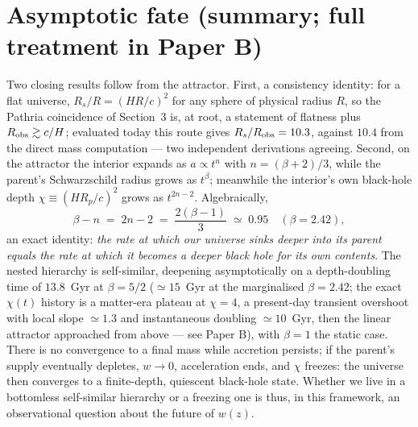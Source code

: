 \documentclass[11pt]{article}
\begin{document}
\section{Asymptotic fate (summary; full treatment in Paper B)}
Two closing results follow from the attractor. First, a consistency identity: for a flat universe, $R_s/R = (HR/c)^2$ for any sphere of physical radius $R$, so the Pathria coincidence of Section~3 is, at root, a statement of flatness plus $R_{\rm obs} \gtrsim c/H$; evaluated today this route gives $R_s/R_{\rm obs} = 10.3$, against $10.4$ from the direct mass computation --- two independent derivations agreeing. Second, on the attractor the interior expands as $a \propto t^{n}$ with $n = (\beta+2)/3$, while the parent's Schwarzschild radius grows as $t^{\beta}$; meanwhile the interior's own black-hole depth $\chi \equiv (HR_p/c)^2$ grows as $t^{2n-2}$. Algebraically,
\begin{equation}
\beta - n \;=\; 2n - 2 \;=\; \frac{2(\beta-1)}{3} \;\simeq\; 0.95 \quad (\beta = 2.42),
\end{equation}
an exact identity: \emph{the rate at which our universe sinks deeper into its parent equals the rate at which it becomes a deeper black hole for its own contents}. The nested hierarchy is self-similar, deepening asymptotically on a depth-doubling time of $13.8$~Gyr at $\beta = 5/2$ ($\simeq 15$~Gyr at the marginalised $\beta = 2.42$; the exact $\chi(t)$ history is a matter-era plateau at $\chi = 4$, a present-day transient overshoot with local slope $\simeq 1.3$ and instantaneous doubling $\simeq 10$~Gyr, then the linear attractor approached from above --- see Paper B), with $\beta = 1$ the static case. There is no convergence to a final mass while accretion persists; if the parent's supply eventually depletes, $w \to 0$, acceleration ends, and $\chi$ freezes: the universe then converges to a finite-depth, quiescent black-hole state. Whether we live in a bottomless self-similar hierarchy or a freezing one is thus, in this framework, an observational question about the future of $w(z)$.
\end{document}
